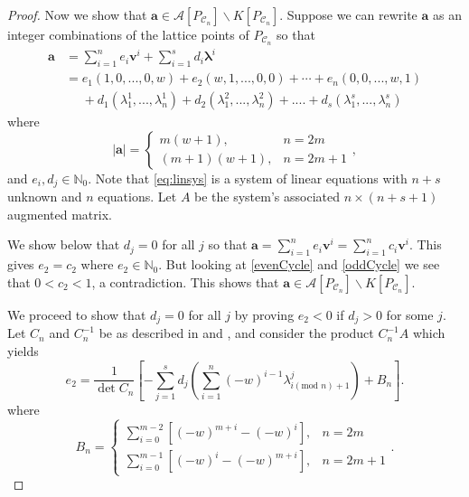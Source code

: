 \documentclass [12pt,a4paper,reqno]{amsart}
\theoremstyle{plain}
\theoremstyle{definition}
\newtheorem{Assumptions and Discussion}[Theorem]{Assumptions and Discussion}
\theoremstyle{remark}
\newcommand\calA{\mathcal{A}}
\newcommand\calC{\mathcal{C}}
\begin{document}
\begin{proof}
Now we show that $\mathbf{a}\in \calA[P_{\calC_{n}}]\backslash K[P_{\calC_{n}}]$. Suppose we can rewrite
$\mathbf{a}$ as an integer combinations of the lattice points of $P_{\calC_n}$ so that
\begin{align}
\mathbf{a}
    &=\sum_{i=1}^{n}e_{i}\mathbf{v}^{i}+\sum_{i=1}^{s}d_{i}\boldsymbol{\lambda}^{i} \label{eq:linsys}\\
    & =e_{1}(1,0,...,0,w)+e_{2}(w,1,...,0,0)+\cdots+e_{n}(0,0,...,w,1) \nonumber\\ 
    &\phantom{=} +d_{1}(\lambda_{1}^{1},...,\lambda_{n}^{1})+d_{2}(\lambda_{1}^{2},...,\lambda_{n}^{2})+....+d_{s}(\lambda_{1}^{s},...,\lambda_{n}^{s})\nonumber
\end{align}
where 
\[
    |\mathbf{a}|=\begin{cases}m(w+1), & n=2m\\(m+1)(w+1),& n=2m+1 \end{cases},
\]  
and $e_{i},d_{j}\in\mathbb{N}_0$. Note that \cref{eq:linsys} is a system of linear equations with $n+s$ unknown and $n$
equations. Let $A$ be the system's associated $n\times(n+s+1)$ augmented matrix. 

We show below that $d_j=0$ for all $j$ so that $\mathbf{a}=\sum_{i=1}^{n}e_{i}\mathbf{v}^{i}=\sum_{i=1}^{n}c_{i}\mathbf{v}^{i}$. This gives \(e_2=c_2\) where \(e_2\in\mathbb{N}_0\). But looking at \cref{evenCycle} and \cref{oddCycle} we see that  \(0<c_2<1\), a contradiction.
This shows that $\mathbf{a}\in \calA[P_{\calC_{n}}]\backslash K[P_{\calC_{n}}]$.

We proceed to show that $d_{j}=0$ for all $j$ by proving $e_2<0$ if $d_{j}>0$ for some $j$. Let $C_n$ and $C_n^{-1}$ be as described in  and , and consider the product $C_n^{-1}A$ which yields 
\begin{equation}\label{eq:e_2} 
    e_2 = \frac{1}{\det C_n}\left[-\sum_{j=1}^{s}d_{j}\left(\sum_{i=1}^{n}(-w)^{i-1}\lambda_{i(\text{mod }n)+1}^{j}\right)+B_n\right].
\end{equation}
where 
\[
    B_n = \begin{cases}
        \sum_{i=0}^{m-2}\left[(-w)^{m+i}-(-w)^{i}\right], & n=2m \\ 
        \sum_{i=0}^{m-1}\left[(-w)^{i}-(-w)^{m+i}\right],& n=2m+1 \end{cases}.
\]



\end{proof}
\end{document}
